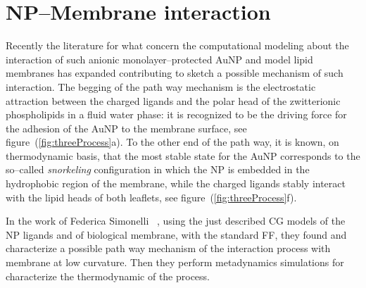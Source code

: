 \newpage
\section{NP--Membrane interaction}
Recently the literature for what concern the computational modeling about the interaction of such anionic monolayer--protected \ac{AuNP} and model lipid membranes has expanded contributing to sketch a possible mechanism of such interaction. The begging of the path way mechanism is the electrostatic attraction between the charged ligands and the polar head of the zwitterionic phospholipids in a fluid water phase: it is recognized to be the driving force for the adhesion of the \ac{AuNP} to the membrane surface, see figure~(\ref{fig:threeProcess}a). To the other end of the path way, it is known, on thermodynamic basis, that the most stable state for the \ac{AuNP} corresponds to the so--called \textit{snorkeling} configuration in which the \ac{NP} is embedded in the hydrophobic region of the membrane, while the charged ligands stably interact with the lipid heads of both leaflets, see figure~(\ref{fig:threeProcess}f). 

In the work of Federica Simonelli \etal\, \cite{ourPaper}, using the just described \ac{CG} \martini models of the \ac{NP} ligands and of biological membrane, with the standard \martini \ac{FF}, they found and characterize a possible path way mechanism of the interaction process with membrane at low curvature. Then they perform metadynamics simulations for characterize the thermodynamic of the process.

